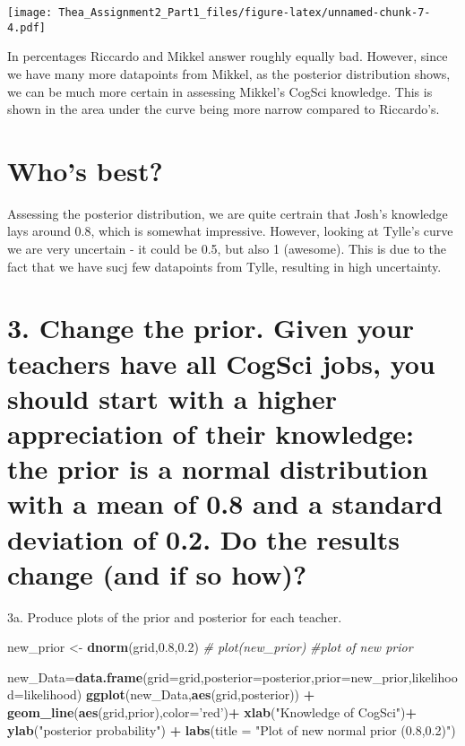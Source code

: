\documentclass[]{article}
\newenvironment{Shaded}{\begin{snugshade}}{\end{snugshade}}
\newcommand{\KeywordTok}[1]{\textcolor[rgb]{0.13,0.29,0.53}{\textbf{#1}}}
\newcommand{\DataTypeTok}[1]{\textcolor[rgb]{0.13,0.29,0.53}{#1}}
\newcommand{\FloatTok}[1]{\textcolor[rgb]{0.00,0.00,0.81}{#1}}
\newcommand{\StringTok}[1]{\textcolor[rgb]{0.31,0.60,0.02}{#1}}
\newcommand{\CommentTok}[1]{\textcolor[rgb]{0.56,0.35,0.01}{\textit{#1}}}
\newcommand{\OperatorTok}[1]{\textcolor[rgb]{0.81,0.36,0.00}{\textbf{#1}}}
\newcommand{\NormalTok}[1]{#1}
\begin{document}
\texttt{[image: Thea\_Assignment2\_Part1\_files/figure-latex/unnamed-chunk-7-4.pdf]}

In percentages Riccardo and Mikkel answer roughly equally bad. However,
since we have many more datapoints from Mikkel, as the posterior
distribution shows, we can be much more certain in assessing Mikkel's
CogSci knowledge. This is shown in the area under the curve being more
narrow compared to Riccardo's.

\section{Who's best?}\label{whos-best}

Assessing the posterior distribution, we are quite certrain that Josh's
knowledge lays around 0.8, which is somewhat impressive. However,
looking at Tylle's curve we are very uncertain - it could be 0.5, but
also 1 (awesome). This is due to the fact that we have sucj few
datapoints from Tylle, resulting in high uncertainty.

\section{3. Change the prior. Given your teachers have all CogSci jobs,
you should start with a higher appreciation of their knowledge: the
prior is a normal distribution with a mean of 0.8 and a standard
deviation of 0.2. Do the results change (and if so
how)?}\label{change-the-prior.-given-your-teachers-have-all-cogsci-jobs-you-should-start-with-a-higher-appreciation-of-their-knowledge-the-prior-is-a-normal-distribution-with-a-mean-of-0.8-and-a-standard-deviation-of-0.2.-do-the-results-change-and-if-so-how}

3a. Produce plots of the prior and posterior for each teacher.

\begin{Shaded}
\begin{Highlighting}[]
\NormalTok{new_prior <-}\StringTok{ }\KeywordTok{dnorm}\NormalTok{(grid,}\FloatTok{0.8}\NormalTok{,}\FloatTok{0.2}\NormalTok{)}
\CommentTok{# plot(new_prior)}
\CommentTok{#plot of new prior}

\NormalTok{new_Data=}\KeywordTok{data.frame}\NormalTok{(}\DataTypeTok{grid=}\NormalTok{grid,}\DataTypeTok{posterior=}\NormalTok{posterior,}\DataTypeTok{prior=}\NormalTok{new_prior,}\DataTypeTok{likelihood=}\NormalTok{likelihood)}
\KeywordTok{ggplot}\NormalTok{(new_Data,}\KeywordTok{aes}\NormalTok{(grid,posterior)) }\OperatorTok{+}\StringTok{ }\KeywordTok{geom_line}\NormalTok{(}\KeywordTok{aes}\NormalTok{(grid,prior),}\DataTypeTok{color=}\StringTok{'red'}\NormalTok{)}\OperatorTok{+}\StringTok{ }\KeywordTok{xlab}\NormalTok{(}\StringTok{"Knowledge of CogSci"}\NormalTok{)}\OperatorTok{+}\StringTok{ }\KeywordTok{ylab}\NormalTok{(}\StringTok{"posterior probability"}\NormalTok{) }\OperatorTok{+}\StringTok{ }\KeywordTok{labs}\NormalTok{(}\DataTypeTok{title =} \StringTok{"Plot of new normal prior (0.8,0.2)"}\NormalTok{)}
\end{Highlighting}
\end{Shaded}
\end{document}

